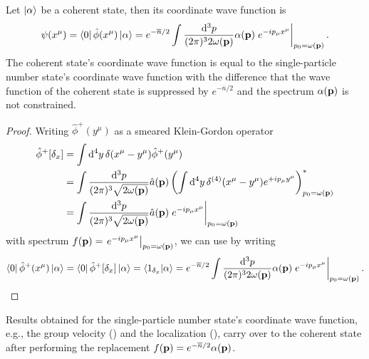 \begin{lemma}\label{thm:coherent_state_wave_function}
	Let $\ket{\alpha}$ be a coherent state, then its coordinate wave function is
	\begin{equation}
		\psi(x^\mu)
		=
		\bra{0}
		\hat\phi(x^\mu)
		\ket{\alpha}
		=
		e^{-\overline{n}/2}
		\int\frac{\dd[3]{p}}{(2\pi)^32\omega(\vb{p})}
		\alpha(\vb{p})
		\eval{e^{-ip_\mu x^\mu}}_{p_0=\omega(\vb{p})}
		.
	\end{equation}
	The coherent state's coordinate wave function is equal to the single-particle number state's coordinate wave function with the difference that the wave function of the coherent state is suppressed by $e^{-\overline{n}/2}$ and the spectrum $\alpha(\vb{p})$ is not constrained.
\end{lemma}
\begin{proof}
	Writing $\hat\phi^+(y^\mu)$ as a smeared Klein-Gordon operator
	\begin{equation*}
		\begin{split}
			\hat\phi^+[\delta_x]
			&=
			\int\dd[4]{y}
			\delta(x^\mu-y^\mu)
			\hat\phi^+(y^\mu)
			\\
			&=
			\int\frac{\dd[3]{p}}{(2\pi)^3\sqrt{2\omega(\vb{p})}}
			\hat{a}(\vb{p})
			\left(
				\int\dd[4]{y}
				\delta^{(4)}(x^\mu-y^\mu)
				e^{+ip_\mu y^\mu}
			\right)_{p_0=\omega(\vb{p})}^*
			\\
			&=
			\int\frac{\dd[3]{p}}{(2\pi)^3\sqrt{2\omega(\vb{p})}}
			\hat{a}(\vb{p})
			\eval{e^{-ip_\mu x^\mu}}_{p_0=\omega(\vb{p})}
		\end{split}
	\end{equation*}
	with spectrum $f(\vb{p})=\eval{e^{-ip_\mu x^\mu}}_{p_0=\omega(\vb{p})}$, we can use  by writing
	\begin{equation*}
		\begin{split}
			\bra{0}
			\hat\phi^+(x^\mu)
			\ket{\alpha}
			=
			\bra{0}
			\hat\phi^+[\delta_x]
			\ket{\alpha}
			=
			\bra{1_{\delta_x}}
			\ket{\alpha}
			=
			e^{-\overline{n}/2}
			\int\frac{\dd[3]{p}}{(2\pi)^32\omega(\vb{p})}
			\alpha(\vb{p})
			\eval{e^{-ip_\mu x^\mu}}_{p_0=\omega(\vb{p})}
			.
		\end{split}
	\end{equation*}
\end{proof}

\begin{corollary}
	Results obtained for the single-particle number state's coordinate wave function, e.g., the group velocity () and the localization (), carry over to the coherent state after performing the replacement $f(\vb{p})=e^{-\overline{n}/2}\alpha(\vb{p})$.
\end{corollary}

